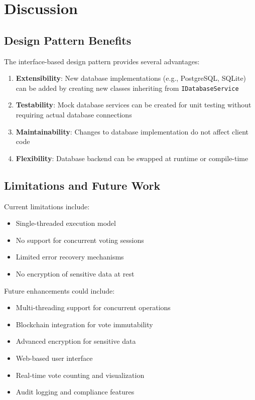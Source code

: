 \documentclass[conference]{IEEEtran}
\begin{document}
\section{Discussion}

\subsection{Design Pattern Benefits}
The interface-based design pattern provides several advantages:

\begin{enumerate}
    \item \textbf{Extensibility}: New database implementations (e.g., PostgreSQL, SQLite) can be added by creating new classes inheriting from \texttt{IDatabaseService}
    \item \textbf{Testability}: Mock database services can be created for unit testing without requiring actual database connections
    \item \textbf{Maintainability}: Changes to database implementation do not affect client code
    \item \textbf{Flexibility}: Database backend can be swapped at runtime or compile-time
\end{enumerate}

\subsection{Limitations and Future Work}
Current limitations include:
\begin{itemize}
    \item Single-threaded execution model
    \item No support for concurrent voting sessions
    \item Limited error recovery mechanisms
    \item No encryption of sensitive data at rest
\end{itemize}

Future enhancements could include:
\begin{itemize}
    \item Multi-threading support for concurrent operations
    \item Blockchain integration for vote immutability
    \item Advanced encryption for sensitive data
    \item Web-based user interface
    \item Real-time vote counting and visualization
    \item Audit logging and compliance features
\end{itemize}
\end{document}
